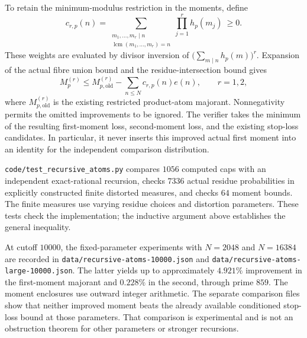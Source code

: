 \documentclass[11pt]{article}
\begin{document}
To retain the minimum-modulus restriction in the moments, define
\[
 c_{r,p}(n)=\sum_{\substack{m_1,\ldots,m_r\mid n\\
                   \operatorname{lcm}(m_1,\ldots,m_r)=n}}
                  \prod_{j=1}^r h_p(m_j)\ \geq0.
\]
These weights are evaluated by divisor inversion of
$\bigl(\sum_{m\mid n}h_p(m)\bigr)^r$. Expansion of the actual fibre
union bound and the residue-intersection bound gives
\[
 M_p^{(r)}\leq M_{p,\mathrm{old}}^{(r)}
       -\sum_{n\leq N} c_{r,p}(n)e(n),\qquad r=1,2,
\]
where $M_{p,\mathrm{old}}^{(r)}$ is the existing restricted product-atom
majorant. Nonnegativity permits the omitted improvements to be ignored.
The verifier takes the minimum of the resulting first-moment loss,
second-moment loss, and the existing stop-loss candidates. In particular,
it never inserts this improved actual first moment into an identity for
the independent comparison distribution.

\texttt{code/test\_recursive\_atoms.py} compares $1056$ computed caps
with an independent exact-rational recursion, checks $7336$ actual residue
probabilities in explicitly constructed finite distorted measures, and
checks $64$ moment bounds. The finite measures use varying residue choices
and distortion parameters. These tests check the implementation; the
inductive argument above establishes the general inequality.

At cutoff $10000$, the fixed-parameter experiments with $N=2048$ and
$N=16384$ are recorded in
\texttt{data/recursive-atoms-10000.json} and
\texttt{data/recursive-atoms-large-10000.json}. The latter yields up to
approximately $4.921\%$ improvement in the first-moment majorant and
$0.228\%$ in the second, through prime $859$. The moment enclosures use
outward integer arithmetic. The separate comparison files show that
neither improved moment beats the already available conditioned stop-loss
bound at those parameters. That comparison is experimental and is not
an obstruction theorem for other parameters or stronger recursions.
\end{document}
